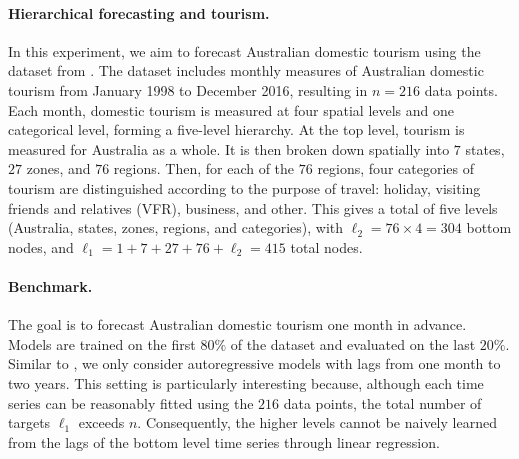\paragraph{Hierarchical forecasting and tourism.} 


In this experiment, we aim to forecast Australian domestic tourism using the dataset from \citet{Wickramasuriya2019optimal}. The dataset includes monthly measures of Australian domestic tourism from January 1998 to December 2016, resulting in $n = 216$ data points. 
Each month, domestic tourism is measured at four spatial levels and one categorical level, forming a five-level hierarchy. At the top level, tourism is measured for Australia as a whole. 
It is then broken down spatially into $7$ states, $27$ zones, and $76$ regions. 
Then, for each of the $76$ regions, four categories of tourism are distinguished  according to the purpose of travel: holiday, visiting friends and
relatives (VFR), business, and other. This gives a total of five levels (Australia, states, zones, regions, and categories), with $\ell_2 = 76 \times 4 = 304$ bottom nodes, and $\ell_1 = 1 + 7 + 27 + 76 + \ell_2 = 415$ total nodes.


\paragraph{Benchmark.} The goal is to forecast Australian domestic tourism one month in advance. Models are trained on the first $80\%$ of the dataset and evaluated on the last $20\%$. 
Similar to \citet{Wickramasuriya2019optimal}, we only consider autoregressive models with lags from one month to two years.
This setting is particularly interesting because, although each time series can be reasonably fitted using the $216$ data points, the total number of targets $\ell_1$ exceeds $n$. Consequently, the higher levels cannot be naively learned from the lags of the bottom level time series through linear regression.

